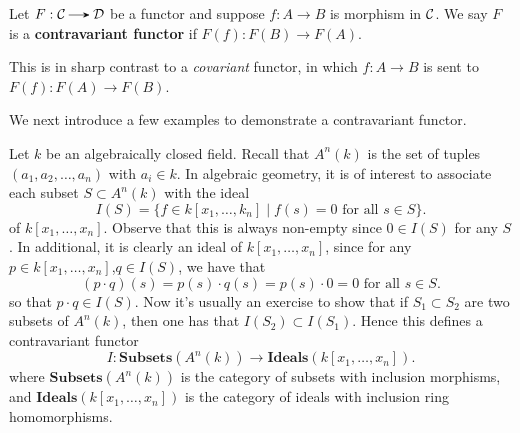
    \begin{definition}
        Let $F: \cc \to \dd$ be a functor and suppose $f: A \to B$ is
        morphism in $\mathcal{C}$. We say $F$ is a \textbf{contravariant functor}
        if $F(f): F(B) \to F(A)$.
    \end{definition}
    This is in sharp contrast to a \emph{covariant} functor, in which $f: A \to B$
    is sent to $F(f): F(A) \to F(B)$. 

    We next introduce a few examples to demonstrate a contravariant functor. 
    
    \begin{example}
        Let $k$ be an algebraically closed field. Recall that $A^n(k)$ is the set of tuples 
        $(a_1, a_2, \dots, a_n)$ with $a_i \in k$. In algebraic geometry, it 
        is of interest to associate each subset $S \subset A^n(k)$
        with the ideal
        \[
            I(S) = \bigg\{f \in k[x_1, \dots, k_n] \;\bigg|\; f(s) = 0 \text{ for all } s \in S \bigg\}.  
        \]
        of $k[x_1, \dots, x_n]$.
        Observe that this is always non-empty since $0 \in I(S)$ for any $S$. 
        In additional, it is clearly an ideal of $k[x_1, \dots, x_n]$, 
        since for any $p \in k[x_1, \dots, x_n]$,$q \in I(S)$, we have that 
        \[
            (p \cdot q)(s) = p(s)\cdot q(s) = p(s) \cdot 0 = 0 \text{ for all } s \in S.
        \]
        so that $p\cdot q \in I(S)$. Now it's usually an exercise to show that 
        if $S_1 \subset S_2$ are two subsets of $A^n(k)$, then one has that 
        $I(S_2)\subset I(S_1)$. Hence this defines a contravariant functor
        \[
            I: \textbf{Subsets}(A^n(k)) \to \textbf{Ideals}(k[x_1,\dots, x_n]).
        \]
        where $\textbf{Subsets}(A^n(k))$ is the category of subsets with inclusion morphisms, 
        and $\textbf{Ideals}(k[x_1,\dots, x_n])$ is the category of ideals with inclusion 
        ring homomorphisms.
    \end{example}


